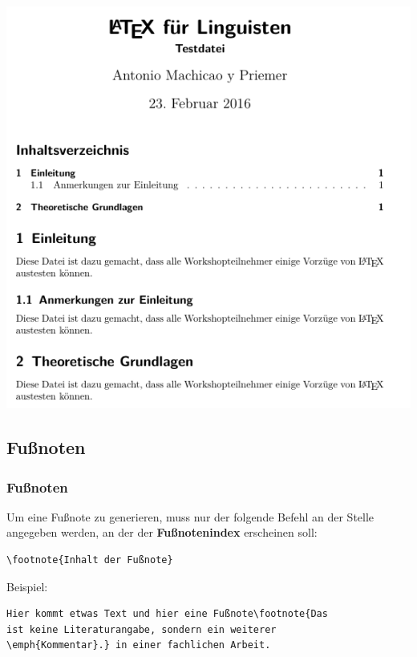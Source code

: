 \begin{frame}[fragile]

\centering
\includegraphics[width=0.67\linewidth]{../../texfiles-beamer/tex-material/WissArb-latex/latexTest5pdf}


\end{frame}


\subsection{Fußnoten}

\begin{frame}[fragile]
\frametitle{Fußnoten}

Um eine Fußnote zu generieren, muss nur der folgende Befehl an der Stelle angegeben werden, an der der \textbf{Fußnotenindex} erscheinen soll:

\begin{lstlisting}
\footnote{Inhalt der Fußnote}
\end{lstlisting}

\noindent Beispiel:
\begin{lstlisting}
Hier kommt etwas Text und hier eine Fußnote\footnote{Das 
ist keine Literaturangabe, sondern ein weiterer 
\emph{Kommentar}.} in einer fachlichen Arbeit. 
\end{lstlisting}

\end{frame}



